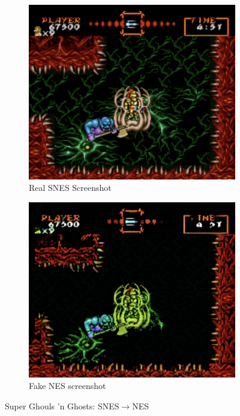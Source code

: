 \documentclass[10pt,twocolumn,letterpaper]{article}
\begin{document}
\begin{figure}[H]
   \centering
   \begin{subfigure}[b]{0.235\textwidth}
      \includegraphics[width=\textwidth]{figures/snes_to_nes/ghouls_n_ghosts_real_B.png}
      \caption{Real SNES Screenshot}
      \label{fig:ss2a}
   \end{subfigure}
   \begin{subfigure}[b]{0.235\textwidth}
      \includegraphics[width=\textwidth]{figures/snes_to_nes/ghouls_n_ghosts_fake_A.png}
      \caption{Fake NES screenshot}
      \label{fig:ss2b}
   \end{subfigure}
   \caption{Super Ghouls 'n Ghosts: SNES$\rightarrow$NES}
\end{figure}
\end{document}
